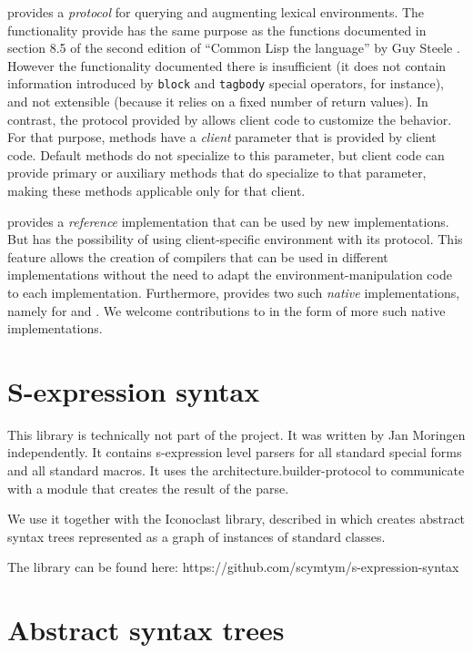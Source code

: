 \trucler{} provides a \clos{} \emph{protocol} for querying and
augmenting lexical environments.  The functionality provide has the
same purpose as the functions documented in section 8.5 of the second
edition of ``Common Lisp the language'' by Guy Steele
\cite{Steele:1990:CLL:95411}.  However the functionality documented
there is insufficient (it does not contain information introduced by
\texttt{block} and \texttt{tagbody} special operators, for instance),
and not extensible (because it relies on a fixed number of return
values).  In contrast, the protocol provided by \trucler{} allows
client code to customize the behavior.  For that purpose, \trucler{}
methods have a \emph{client} parameter that is provided by client
code.  Default \trucler{} methods do not specialize to this parameter,
but client code can provide primary or auxiliary methods that do
specialize to that parameter, making these methods applicable only for
that client.

\trucler{} provides a \emph{reference} implementation that can be used
by new \commonlisp{} implementations.  But \trucler{} has the
possibility of using client-specific environment with its protocol.
This feature allows the creation of compilers that can be used in
different \commonlisp{} implementations without the need to adapt the
environment-manipulation code to each implementation.  Furthermore,
\trucler{} provides two such \emph{native} implementations, namely for
\sbcl{} and \ccl{}.  We welcome contributions to \trucler{} in the
form of more such native implementations.

\section{S-expression syntax}
\label{sec-s-expression-syntax}

This library is technically not part of the \sysname{} project.  It
was written by Jan Moringen independently.  It contains s-expression
level parsers for all standard special forms and all standard macros.
It uses the architecture.builder-protocol to communicate with a module
that creates the result of the parse.

We use it together with the Iconoclast library, described in
 which creates abstract syntax trees represented as
a graph of instances of standard classes.

The library can be found here:
https://github.com/scymtym/s-expression-syntax 

\section{Abstract syntax trees}
\label{sec-ast}

